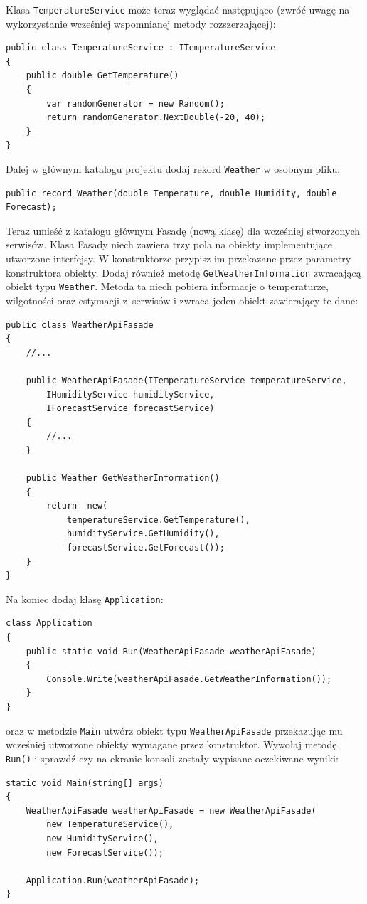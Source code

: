 Klasa \texttt{TemperatureService} może teraz wyglądać następująco (zwróć uwagę na wykorzystanie wcześniej wspomnianej metody rozszerzającej):
\begin{lstlisting}	
public class TemperatureService : ITemperatureService
{
	public double GetTemperature()
	{
		var randomGenerator = new Random();
		return randomGenerator.NextDouble(-20, 40);
	}
}
\end{lstlisting}

Dalej w głównym katalogu projektu dodaj rekord \texttt{Weather} w osobnym pliku:
\begin{lstlisting}	
public record Weather(double Temperature, double Humidity, double Forecast);
\end{lstlisting}

Teraz umieść z katalogu głównym Fasadę (nową klasę) dla wcześniej stworzonych serwisów. Klasa Fasady niech zawiera trzy pola na obiekty implementujące utworzone interfejsy. W konstruktorze przypisz im przekazane przez parametry konstruktora obiekty. Dodaj również metodę \texttt{GetWeatherInformation} zwracającą obiekt typu \texttt{Weather}. Metoda ta niech pobiera informacje o temperaturze, wilgotności oraz estymacji z~serwisów i zwraca jeden obiekt zawierający te dane:
\begin{lstlisting}	
public class WeatherApiFasade
{
	//...
	
	public WeatherApiFasade(ITemperatureService temperatureService, 
		IHumidityService humidityService,
		IForecastService forecastService)
	{
		//...
	}
	
	public Weather GetWeatherInformation()
	{
		return  new(
			temperatureService.GetTemperature(),
			humidityService.GetHumidity(),
			forecastService.GetForecast());
	}
}
\end{lstlisting}

Na koniec dodaj klasę \texttt{Application}:
\begin{lstlisting}	
class Application
{
	public static void Run(WeatherApiFasade weatherApiFasade)
	{
		Console.Write(weatherApiFasade.GetWeatherInformation());
	}
}
\end{lstlisting}
oraz w metodzie \texttt{Main} utwórz obiekt typu \texttt{WeatherApiFasade} przekazując mu wcześniej utworzone obiekty wymagane przez konstruktor. Wywołaj metodę \texttt{Run()} i sprawdź czy na ekranie konsoli zostały wypisane oczekiwane wyniki:
\begin{lstlisting}	
static void Main(string[] args)
{
	WeatherApiFasade weatherApiFasade = new WeatherApiFasade(
		new TemperatureService(), 
		new HumidityService(),
		new ForecastService());
	
	Application.Run(weatherApiFasade);
}
\end{lstlisting}
